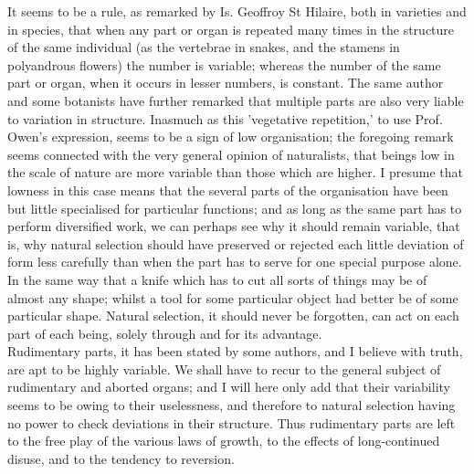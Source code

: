\indent It seems to be a rule, as remarked by Is. Geoffroy St Hilaire, both in varieties and in species, that when any part or organ is repeated many times in the structure of the same individual (as the vertebrae in snakes, and the stamens in polyandrous flowers) the number is variable; whereas the number of the same part or organ, when it occurs in lesser numbers, is constant. The same author and some botanists have further remarked that multiple parts are also very liable to variation in structure. Inasmuch as this 'vegetative repetition,' to use Prof. Owen's expression, seems to be a sign of low organisation; the foregoing remark seems connected with the very general opinion of naturalists, that beings low in the scale of nature are more variable than those which are higher. I presume that lowness in this case means that the several parts of the organisation have been but little specialised for particular functions; and as long as the same part has to perform diversified work, we can perhaps see why it should remain variable, that is, why natural selection should have preserved or rejected each little deviation of form less carefully than when the part has to serve for one special purpose alone. In the same way that a knife which has to cut all sorts of things may be of almost any shape; whilst a tool for some particular object had better be of some particular shape. Natural selection, it should never be forgotten, can act on each part of each being, solely through and for its advantage. \\
\indent Rudimentary parts, it has been stated by some authors, and I believe with truth, are apt to be highly variable. We shall have to recur to the general subject of rudimentary and aborted organs; and I will here only add that their variability seems to be owing to their uselessness, and therefore to natural selection having no power to check deviations in their structure. Thus rudimentary parts are left to the free play of the various laws of growth, to the effects of long-continued disuse, and to the tendency to reversion.\\


